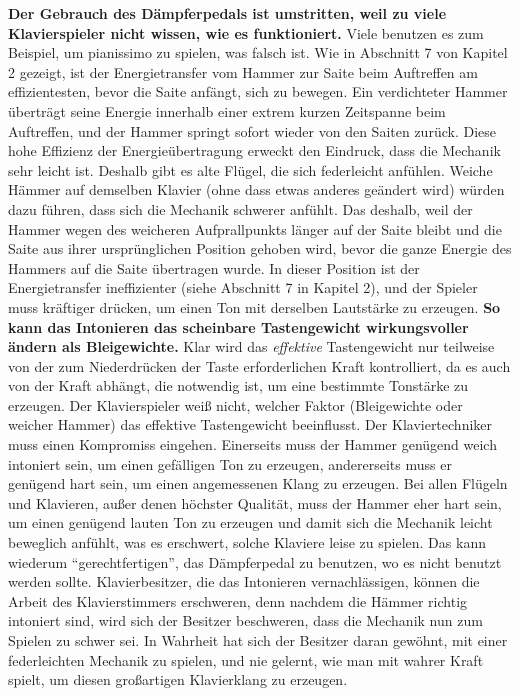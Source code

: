 \textbf{Der Gebrauch des Dämpferpedals ist umstritten, weil zu viele Klavierspieler nicht wissen, wie es funktioniert.}
Viele benutzen es zum Beispiel, um pianissimo zu spielen, was falsch ist.
Wie in Abschnitt 7 von Kapitel 2 gezeigt, ist der Energietransfer vom Hammer zur Saite beim Auftreffen am effizientesten, bevor die Saite anfängt, sich zu bewegen.
Ein verdichteter Hammer überträgt seine Energie innerhalb einer extrem kurzen Zeitspanne beim Auftreffen, und der Hammer springt sofort wieder von den Saiten zurück.
Diese hohe Effizienz der Energieübertragung erweckt den Eindruck, dass die Mechanik sehr leicht ist.
Deshalb gibt es alte Flügel, die sich federleicht anfühlen.
Weiche Hämmer auf demselben Klavier (ohne dass etwas anderes geändert wird) würden dazu führen, dass sich die Mechanik schwerer anfühlt.
Das deshalb, weil der Hammer wegen des weicheren Aufprallpunkts länger auf der Saite bleibt und die Saite aus ihrer ursprünglichen Position gehoben wird, bevor die ganze Energie des Hammers auf die Saite übertragen wurde.
In dieser Position ist der Energietransfer ineffizienter (siehe Abschnitt 7 in Kapitel 2), und der Spieler muss kräftiger drücken, um einen Ton mit derselben Lautstärke zu erzeugen.
\textbf{So kann das Intonieren das scheinbare Tastengewicht wirkungsvoller ändern als Bleigewichte.}
Klar wird das \textit{effektive} Tastengewicht nur teilweise von der zum Niederdrücken der Taste erforderlichen Kraft kontrolliert, da es auch von der Kraft abhängt, die notwendig ist, um eine bestimmte Tonstärke zu erzeugen.
Der Klavierspieler weiß nicht, welcher Faktor (Bleigewichte oder weicher Hammer) das effektive Tastengewicht beeinflusst.
Der Klaviertechniker muss einen Kompromiss eingehen.
Einerseits muss der Hammer genügend weich intoniert sein, um einen gefälligen Ton zu erzeugen, andererseits muss er genügend hart sein, um einen angemessenen Klang zu erzeugen.
Bei allen Flügeln und Klavieren, außer denen höchster Qualität, muss der Hammer eher hart sein, um einen genügend lauten Ton zu erzeugen und damit sich die Mechanik leicht beweglich anfühlt, was es erschwert, solche Klaviere leise zu spielen.
Das kann wiederum \enquote{gerechtfertigen}, das Dämpferpedal zu benutzen, wo es nicht benutzt werden sollte.
Klavierbesitzer, die das Intonieren vernachlässigen, können die Arbeit des Klavierstimmers erschweren, denn nachdem die Hämmer richtig intoniert sind, wird sich der Besitzer beschweren, dass die Mechanik nun zum Spielen zu schwer sei.
In Wahrheit hat sich der Besitzer daran gewöhnt, mit einer federleichten Mechanik zu spielen, und nie gelernt, wie man mit wahrer Kraft spielt, um diesen großartigen Klavierklang zu erzeugen.


